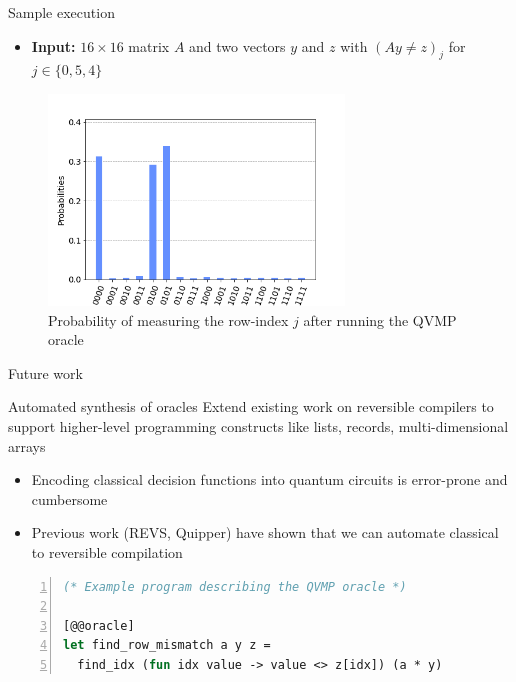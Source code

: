\documentclass[10pt]{beamer}
\begin{document}
\begin{frame}{Sample execution}
  \begin{itemize}
    \item \textbf{Input:} $16 \times 16$ matrix $A$ and two vectors $y$ and $z$
      with $(Ay \neq z)_j$ for $j \in \{0, 5, 4\}$
  \end{itemize}
  \begin{figure}
    \centering
    \includegraphics[width=0.7\textwidth]{assets/16x16-simulation.png}
    \caption{Probability of measuring the row-index $j$ after running the QVMP
    oracle}
    \label{fig:qvmp_oracle_sample_execution}
  \end{figure}
\end{frame}


\begin{frame}[t,fragile]{Future work}
  \begin{exampleblock}{Automated synthesis of oracles}
    Extend existing work on reversible compilers to support higher-level
    programming constructs like lists, records, multi-dimensional arrays
  \end{exampleblock}
  \begin{itemize}
    \item Encoding classical decision functions into quantum circuits is
      error-prone and cumbersome
    \item Previous work (REVS, Quipper) have shown that we can automate
      classical to reversible compilation
  \end{itemize}
  \begin{lstlisting}[frame=single,language=ML, numbers=left]
(* Example program describing the QVMP oracle *)

[@@oracle]
let find_row_mismatch a y z =
  find_idx (fun idx value -> value <> z[idx]) (a * y)
  \end{lstlisting}
\end{frame}
\end{document}
